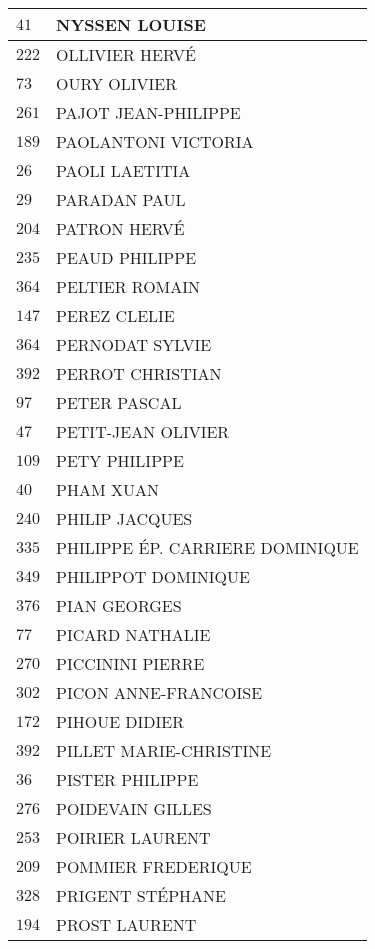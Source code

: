 \begin{xltabular}{\linewidth}{|l|X|}
    \hline
    $41$ & NYSSEN LOUISE \\
    \hline
    $222$ & OLLIVIER HERVÉ \\
    \hline
    $73$ & OURY OLIVIER \\
    \hline
    $261$ & PAJOT JEAN-PHILIPPE \\
    \hline
    $189$ & PAOLANTONI VICTORIA \\
    \hline
    $26$ & PAOLI LAETITIA \\
    \hline
    $29$ & PARADAN PAUL \\
    \hline
    $204$ & PATRON HERVÉ \\
    \hline
    $235$ & PEAUD PHILIPPE \\
    \hline
    $364$ & PELTIER ROMAIN \\
    \hline
    $147$ & PEREZ CLELIE \\
    \hline
    $364$ & PERNODAT SYLVIE \\
    \hline
    $392$ & PERROT CHRISTIAN \\
    \hline
    $97$ & PETER PASCAL \\
    \hline
    $47$ & PETIT-JEAN OLIVIER \\
    \hline
    $109$ & PETY PHILIPPE \\
    \hline
    $40$ & PHAM XUAN \\
    \hline
    $240$ & PHILIP JACQUES \\
    \hline
    $335$ & PHILIPPE ÉP. CARRIERE DOMINIQUE \\
    \hline
    $349$ & PHILIPPOT DOMINIQUE \\
    \hline
    $376$ & PIAN GEORGES \\
    \hline
    $77$ & PICARD NATHALIE \\
    \hline
    $270$ & PICCININI PIERRE \\
    \hline
    $302$ & PICON ANNE-FRANCOISE \\
    \hline
    $172$ & PIHOUE DIDIER \\
    \hline
    $392$ & PILLET MARIE-CHRISTINE \\
    \hline
    $36$ & PISTER PHILIPPE \\
    \hline
    $276$ & POIDEVAIN GILLES \\
    \hline
    $253$ & POIRIER LAURENT \\
    \hline
    $209$ & POMMIER FREDERIQUE \\
    \hline
    $328$ & PRIGENT STÉPHANE \\
    \hline
    $194$ & PROST LAURENT \\

\end{xltabular}
